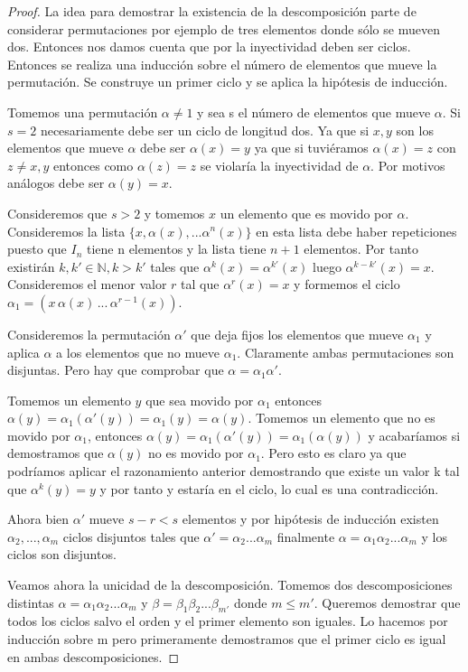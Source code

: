 \begin{proof}
La idea para demostrar la existencia de la descomposición parte de considerar permutaciones por ejemplo de tres elementos donde sólo se mueven dos. Entonces nos damos cuenta que por la inyectividad deben ser ciclos. Entonces se realiza una inducción sobre el número de elementos que mueve la permutación. Se construye un primer ciclo y se aplica la hipótesis de inducción.

Tomemos una permutación $\alpha \neq 1$ y sea s el número de elementos que mueve $\alpha$. Si $s = 2$ necesariamente debe ser un ciclo de longitud dos. Ya que si $x,y$ son los elementos que mueve $\alpha$ debe ser $\alpha(x) = y$ ya que si tuviéramos $\alpha(x) = z$ con $z \neq x,y$ entonces como $\alpha(z) = z$ se violaría la inyectividad de $\alpha$. Por motivos análogos debe ser $\alpha(y) = x$.

Consideremos que $s > 2$ y tomemos $x$ un elemento que es movido por $\alpha$. Consideremos la lista $\{x,\alpha(x),...\alpha^n(x)\}$ en esta lista debe haber repeticiones puesto que $I_n$ tiene n elementos y la lista tiene $n+1$ elementos. Por tanto existirán $k,k' \in \mathbb{N}, k > k'$ tales que $\alpha^{k}(x) = \alpha^{k'}(x)$ luego $\alpha^{k-k'}(x) = x$. Consideremos el menor valor $r$ tal que $\alpha^r(x) = x$ y formemos el ciclo $\alpha_1 = (x \, \alpha(x) \, ...  \, \alpha^{r-1}(x))$.

Consideremos la permutación $\alpha'$ que deja fijos los elementos que mueve $\alpha_1$ y aplica $\alpha$ a los elementos que no mueve $\alpha_1$. Claramente  ambas permutaciones son disjuntas. Pero hay que comprobar que $\alpha = \alpha_1 \alpha'$.

Tomemos un elemento $y$ que sea movido por $\alpha_1$ entonces $\alpha(y) = \alpha_1(\alpha'(y)) = \alpha_1(y) = \alpha(y)$. Tomemos un elemento que no es movido por $\alpha_1$, entonces $\alpha(y) = \alpha_1(\alpha'(y)) = \alpha_1(\alpha(y))$ y acabaríamos si demostramos que $\alpha(y)$ no es movido por $\alpha_1$. Pero esto es claro ya que podríamos aplicar el razonamiento anterior demostrando que existe un valor k tal que $\alpha^k(y) = y$ y por tanto y estaría en el ciclo, lo cual es una contradicción.

Ahora bien $\alpha'$ mueve $s-r < s$ elementos y por hipótesis de inducción existen $\alpha_2,...,\alpha_m$ ciclos disjuntos tales que $\alpha' = \alpha_2...\alpha_m$ finalmente $\alpha = \alpha_1\alpha_2...\alpha_m$ y los ciclos son disjuntos.

Veamos ahora la unicidad de la descomposición. Tomemos dos descomposiciones distintas $\alpha = \alpha_1\alpha_2...\alpha_m$ y $\beta = \beta_1\beta_2...\beta_{m'}$ donde $m \le m'$. Queremos demostrar que todos los ciclos salvo el orden y el primer elemento son iguales. Lo hacemos por inducción sobre m pero primeramente demostramos que el primer ciclo es igual en ambas descomposiciones.


\end{proof}
